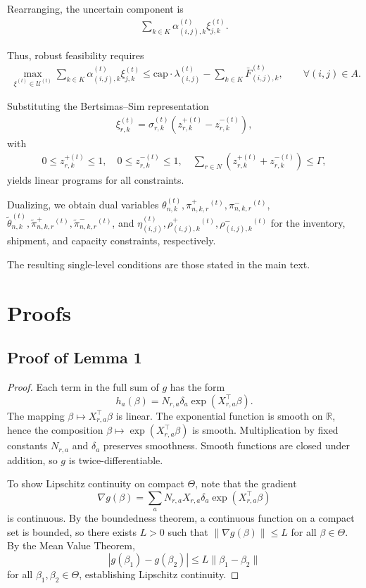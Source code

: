 \documentclass{article}
\begin{document}
Rearranging, the uncertain component is
\begin{align}
\sum_{k\in K}
\alpha_{(i,j),k}^{(t)} \xi_{j,k}^{(t)}.
\end{align}

Thus, robust feasibility requires
\begin{align}
\max_{\xi^{(t)} \in \mathcal U^{(t)}}
\sum_{k\in K}
\alpha_{(i,j),k}^{(t)} \xi_{j,k}^{(t)}
\le
\mathrm{cap}\cdot \lambda_{(i,j)}^{(t)}
-
\sum_{k\in K} \bar F_{(i,j),k}^{(t)},
\qquad \forall (i,j)\in A.
\end{align}

\medskip

Substituting the Bertsimas--Sim representation
\begin{align}
\xi_{r,k}^{(t)} =
\sigma_{r,k}^{(t)}
\left(
z_{r,k}^{+(t)} - z_{r,k}^{-(t)}
\right),
\end{align}
with
\begin{align}
0 \le z_{r,k}^{+(t)} \le 1,\quad
0 \le z_{r,k}^{-(t)} \le 1,\quad
\sum_{r \in N} \left( z_{r,k}^{+(t)} + z_{r,k}^{-(t)} \right) \le \Gamma,
\end{align}
yields linear programs for all constraints.

Dualizing, we obtain dual variables
\(\theta_{n,k}^{(t)}, \pi^+_{n,k,r}{}^{(t)}, \pi^-_{n,k,r}{}^{(t)}\),
\(\tilde{\theta}_{n,k}^{(t)}, \tilde{\pi}^+_{n,k,r}{}^{(t)}, \tilde{\pi}^-_{n,k,r}{}^{(t)}\),
and
\(\eta_{(i,j)}^{(t)}, \rho^+_{(i,j),k}{}^{(t)}, \rho^-_{(i,j),k}{}^{(t)}\)
for the inventory, shipment, and capacity constraints, respectively.

The resulting single-level conditions are those stated in the main text.

\section{Proofs}

\subsection{Proof of Lemma 1}
\label{B.1}

\begin{proof}
Each term in the full sum of $g$ has the form
\[
h_a(\beta) = N_{r,a}\delta_a \exp(X_{r,a}^\top \beta).
\]
The mapping $\beta \mapsto X_{r,a}^\top \beta$ is linear. 
The exponential function is smooth on $\mathbb{R}$, hence the composition 
$\beta \mapsto \exp(X_{r,a}^\top \beta)$ 
is smooth. 
Multiplication by fixed constants $N_{r,a}$ and $\delta_a$ preserves smoothness.  
Smooth functions are closed under addition, so $g$ is twice-differentiable.

To show Lipschitz continuity on compact $\Theta$, note that the gradient 
\[
\nabla g(\beta)
=
\sum_a 
N_{r,a}X_{r,a}\delta_a\exp(X_{r,a}^\top \beta)
\]
is continuous. 
By the boundedness theorem, a continuous function on a compact set is bounded, so there exists $L > 0$ such that 
$\|\nabla g(\beta)\| \le L$ for all $\beta \in \Theta$.  
By the Mean Value Theorem,
\[
|g(\beta_1) - g(\beta_2)|
\le
L \|\beta_1 - \beta_2\|
\]
for all $\beta_1,\beta_2 \in \Theta$, establishing Lipschitz continuity.
\end{proof}
\end{document}
